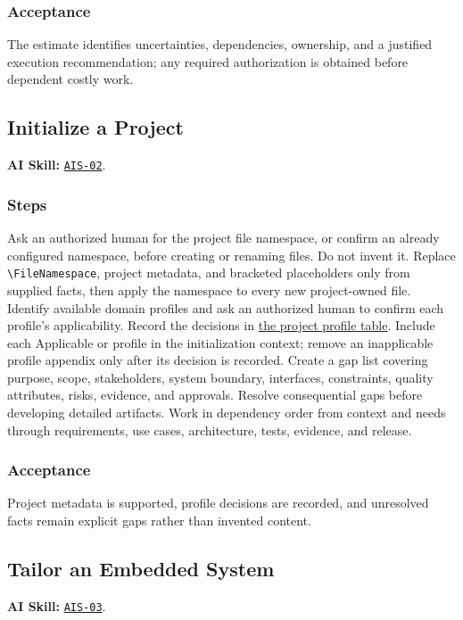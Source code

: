 \subsubsection*{Acceptance}
\label{Section:AIEstimateAcceptance}
The estimate identifies uncertainties, dependencies, ownership, and a justified execution recommendation; any required authorization is obtained before dependent costly work.

\subsection{Initialize a Project}
\label{Section:AIInitializeSteps}
\noindent\textbf{AI Skill:} \hyperref[Skill:AIS-02]{\texttt{AIS-02}}.

\subsubsection*{Steps}
\label{Section:AIInitializeTaskSteps}
Ask an authorized human for the project file namespace, or confirm an already
configured namespace, before creating or renaming files. Do not invent it.
Replace \verb|\FileNamespace|, project metadata, and bracketed placeholders
only from supplied facts, then apply the namespace to every new project-owned
file.
Identify available domain profiles and ask an authorized human to confirm each
profile's applicability. Record the decisions in
\hyperref[Table:ProjectDomainProfiles]{the project profile table}. Include each
Applicable or \OwnedTBD{} profile in the initialization context; remove an
inapplicable profile appendix only after its decision is recorded.
Create a gap list covering purpose, scope, stakeholders, system boundary,
interfaces, constraints, quality attributes, risks, evidence, and approvals.
Resolve consequential gaps before developing detailed artifacts. Work in
dependency order from context and needs through requirements, use cases,
architecture, tests, evidence, and release.

\subsubsection*{Acceptance}
\label{Section:AIInitializeAcceptance}
Project metadata is supported, profile decisions are recorded, and unresolved facts remain explicit gaps rather than invented content.

\subsection{Tailor an Embedded System}
\label{Section:AIEmbeddedSteps}
\noindent\textbf{AI Skill:} \hyperref[Skill:AIS-03]{\texttt{AIS-03}}.


